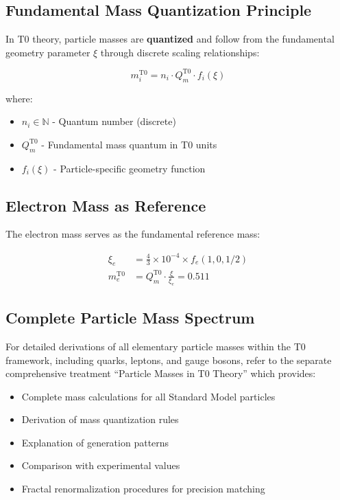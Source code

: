 \documentclass[12pt,a4paper]{article}
\begin{document}
	\subsection{Fundamental Mass Quantization Principle}
	
	In T0 theory, particle masses are \textbf{quantized} and follow from the fundamental geometry parameter $\xi$ through discrete scaling relationships:
	
	\begin{equation}
		m_i^{\mathrm{T0}} = n_i \cdot Q_m^{\mathrm{T0}} \cdot f_i(\xi)
	\end{equation}
	
	where:
	\begin{itemize}
		\item $n_i \in \mathbb{N}$ - Quantum number (discrete)
		\item $Q_m^{\mathrm{T0}}$ - Fundamental mass quantum in T0 units
		\item $f_i(\xi)$ - Particle-specific geometry function
	\end{itemize}
	
	\subsection{Electron Mass as Reference}
	
	The electron mass serves as the fundamental reference mass:
	
	\begin{align}
		\xi_e &= \frac{4}{3} \times 10^{-4} \times f_e(1,0,1/2) \\
		m_e^{\mathrm{T0}} &= Q_m^{\mathrm{T0}} \cdot \frac{\xi}{\xi_e} = 0.511
	\end{align}
	
	\subsection{Complete Particle Mass Spectrum}
	
	For detailed derivations of all elementary particle masses within the T0 framework, including quarks, leptons, and gauge bosons, refer to the separate comprehensive treatment ``Particle Masses in T0 Theory'' which provides:
	
	\begin{itemize}
		\item Complete mass calculations for all Standard Model particles
		\item Derivation of mass quantization rules
		\item Explanation of generation patterns
		\item Comparison with experimental values
		\item Fractal renormalization procedures for precision matching
	\end{itemize}
	
\end{document}
